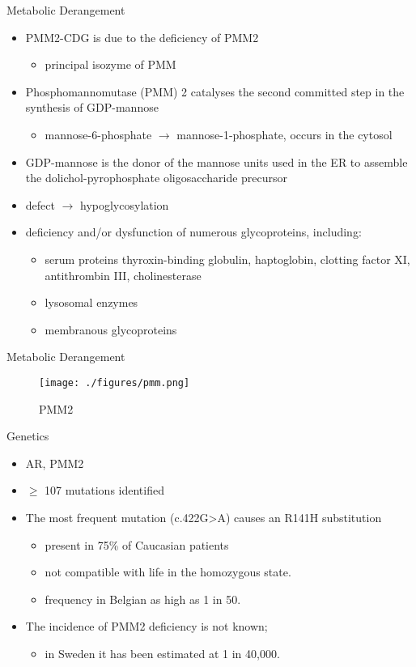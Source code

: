 \documentclass[presentation, smaller]{beamer}
\begin{document}
\begin{frame}[label={sec:org8ab4949}]{Metabolic Derangement}
\begin{itemize}
\item PMM2-CDG is due to the deficiency of PMM2
\begin{itemize}
\item principal isozyme of PMM
\end{itemize}
\item Phosphomannomutase (PMM) 2 catalyses the second committed step in the synthesis of GDP-mannose
\begin{itemize}
\item mannose-6-phosphate \(\to\) mannose-1-phosphate, occurs in the cytosol
\end{itemize}
\item GDP-mannose is the donor of the mannose units used in the ER to
assemble the dolichol-pyrophosphate oligosaccharide precursor
\item defect \(\to\) hypoglycosylation
\item deficiency and/or dysfunction of numerous glycoproteins, including:
\begin{itemize}
\item serum proteins thyroxin-binding globulin, haptoglobin, clotting factor XI, antithrombin III, cholinesterase
\item lysosomal enzymes
\item membranous glycoproteins
\end{itemize}
\end{itemize}
\end{frame}

\begin{frame}[label={sec:orge1f068e}]{Metabolic Derangement}
\begin{figure}[htbp]
\centering
\texttt{[image: ./figures/pmm.png]}
\caption{\label{fig:org5960753}
PMM2}
\end{figure}
\end{frame}




\begin{frame}[label={sec:orgfbb97f5}]{Genetics}
\begin{itemize}
\item AR, PMM2
\item \(\ge\) 107 mutations identified
\item The most frequent mutation (c.422G>A) causes an R141H substitution
\begin{itemize}
\item present in 75\% of Caucasian patients
\item not compatible with life in the homozygous state.
\item frequency in Belgian as high as 1 in 50.
\end{itemize}
\item The incidence of PMM2 deficiency is not known;
\begin{itemize}
\item in Sweden it has been estimated at 1 in 40,000.
\end{itemize}
\end{itemize}
\end{frame}
\end{document}
